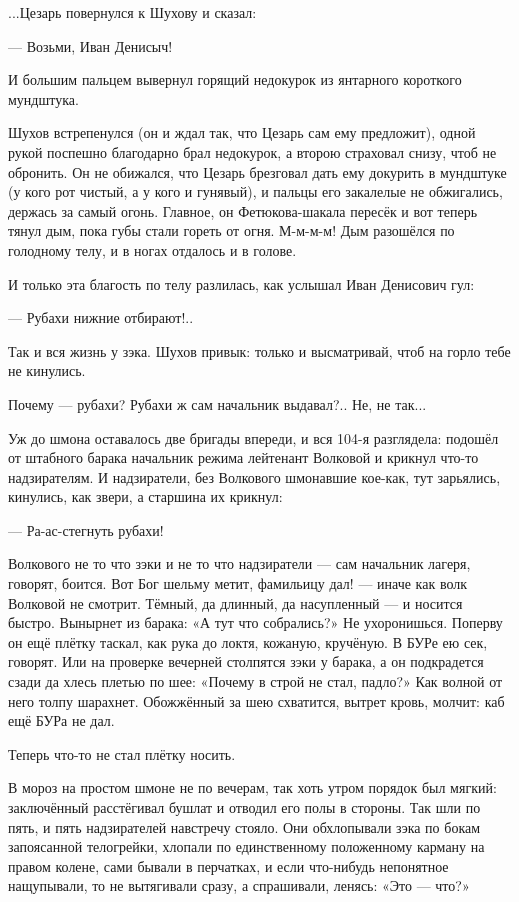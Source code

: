 ...Цезарь повернулся к Шухову и сказал:

--- Возьми, Иван Денисыч!

И большим пальцем вывернул горящий недокурок из янтарного короткого мундштука.

Шухов встрепенулся (он и ждал так, что Цезарь сам ему предложит), одной рукой поспешно
благодарно брал недокурок, а второю страховал снизу, чтоб не обронить. Он не обижался, что
Цезарь брезговал дать ему докурить в мундштуке (у кого рот чистый, а у кого и гунявый), и
пальцы его закалелые не обжигались, держась за самый огонь. Главное, он Фетюкова-шакала
пересёк и вот теперь тянул дым, пока губы стали гореть от огня. М-м-м-м! Дым разошёлся по
голодному телу, и в ногах отдалось и в голове.

И только эта благость по телу разлилась, как услышал Иван Денисович гул:

--- Рубахи нижние отбирают!..

Так и вся жизнь у зэка. Шухов привык: только и высматривай, чтоб на горло тебе не кинулись.

Почему --- рубахи? Рубахи ж сам начальник выдавал?.. Не, не так...

Уж до шмона оставалось две бригады впереди, и вся 104-я разглядела: подошёл от штабного барака
начальник режима лейтенант Волковой и крикнул что-то надзирателям. И надзиратели, без
Волкового шмонавшие кое-как, тут зарьялись, кинулись, как звери, а старшина их крикнул:

--- Ра-ас-стегнуть рубахи!

Волкового не то что зэки и не то что надзиратели --- сам начальник лагеря, говорят, боится. Вот
Бог шельму метит, фамильицу дал! --- иначе как волк Волковой не смотрит. Тёмный, да длинный, да
насупленный --- и носится быстро. Вынырнет из барака: «А тут что собрались?» Не ухоронишься.
Поперву он ещё плётку таскал, как рука до локтя, кожаную, кручёную. В БУРе ею сек, говорят. Или
на проверке вечерней столпятся зэки у барака, а он подкрадется сзади да хлесь плетью по шее:
«Почему в строй не стал, падло?» Как волной от него толпу шарахнет. Обожжённый за шею
схватится, вытрет кровь, молчит: каб ещё БУРа не дал.

Теперь что-то не стал плётку носить.

В мороз на простом шмоне не по вечерам, так хоть утром порядок был мягкий: заключённый
расстёгивал бушлат и отводил его полы в стороны. Так шли по пять, и пять надзирателей
навстречу стояло. Они обхлопывали зэка по бокам запоясанной телогрейки, хлопали по
единственному положенному карману на правом колене, сами бывали в перчатках, и если
что-нибудь непонятное нащупывали, то не вытягивали сразу, а спрашивали, ленясь: «Это --- что?»

